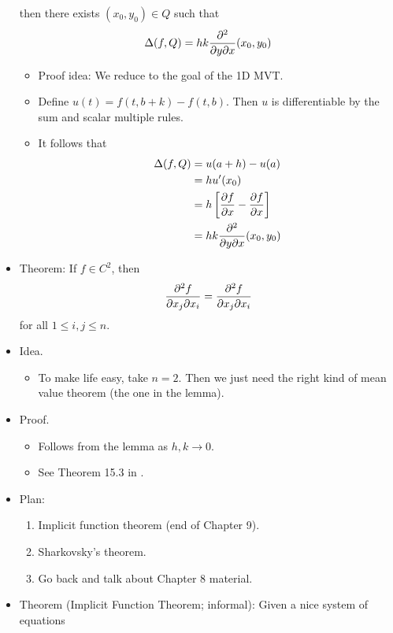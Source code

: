 \documentclass[../notes.tex]{subfiles}
\begin{document}
\begin{itemize}
    then there exists $(x_0,y_0)\in Q$ such that
    \begin{equation*}
        \Delta(f,Q) = hk{\pdv[2]{}{y}{x}}(x_0,y_0)
    \end{equation*}
    \begin{itemize}
        \item Proof idea: We reduce to the goal of the 1D MVT.
        \item Define $u(t)=f(t,b+k)-f(t,b)$. Then $u$ is differentiable by the sum and scalar multiple rules.
        \item It follows that
        \begin{align*}
            \Delta(f,Q) &= u(a+h)-u(a)\\
            &= hu'(x_0)\\
            &= h\left[ \pdv{f}{x}(x_0,b+k)-\pdv{f}{x}(x_0,b) \right]\\
            &= hk{\pdv[2]{}{y}{x}}(x_0,y_0)
        \end{align*}
    \end{itemize}
    \item Theorem: If $f\in C^2$, then
    \begin{equation*}
        \pdv[2]{f}{x_j}{x_i} = \pdv[2]{f}{x_j}{x_i}
    \end{equation*}
    for all $1\leq i,j\leq n$.
    \item Idea.
    \begin{itemize}
        \item To make life easy, take $n=2$. Then we just need the right kind of mean value theorem (the one in the lemma).
    \end{itemize}
    \item Proof.
    \begin{itemize}
        \item Follows from the lemma as $h,k\to 0$.
        \item See Theorem 15.3 in \textcite{bib:CAAGThomasNotes}.
    \end{itemize}
    \item {}Plan:
    \begin{enumerate}
        \item Implicit function theorem (end of Chapter 9).
        \item Sharkovsky's theorem.
        \item Go back and talk about Chapter 8 material.
    \end{enumerate}
    \item Theorem (Implicit Function Theorem; informal): Given a nice system of equations 

\end{itemize}
\end{document}
